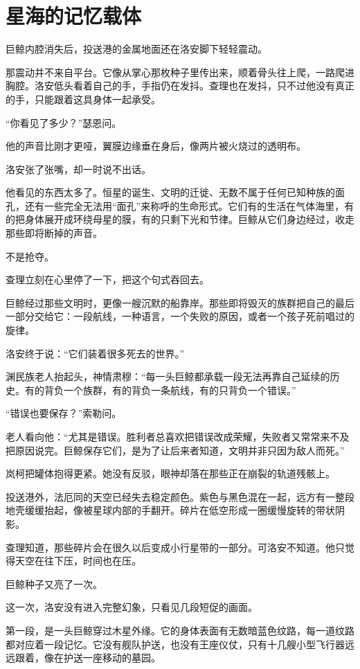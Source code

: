 \chapter{星海的记忆载体}

巨鲸内腔消失后，投送港的金属地面还在洛安脚下轻轻震动。

那震动并不来自平台。它像从掌心那枚种子里传出来，顺着骨头往上爬，一路爬进胸腔。洛安低头看着自己的手，手指仍在发抖。查理也在发抖，只不过他没有真正的手，只能跟着这具身体一起承受。

“你看见了多少？”瑟恩问。

他的声音比刚才更哑，翼膜边缘垂在身后，像两片被火烧过的透明布。

洛安张了张嘴，却一时说不出话。

他看见的东西太多了。恒星的诞生、文明的迁徙、无数不属于任何已知种族的面孔，还有一些完全无法用“面孔”来称呼的生命形式。它们有的生活在气体海里，有的把身体展开成环绕母星的膜，有的只剩下光和节律。巨鲸从它们身边经过，收走那些即将断掉的声音。

不是抢夺。

查理立刻在心里停了一下，把这个句式吞回去。

巨鲸经过那些文明时，更像一艘沉默的船靠岸。那些即将毁灭的族群把自己的最后一部分交给它：一段航线，一种语言，一个失败的原因，或者一个孩子死前唱过的旋律。

洛安终于说：“它们装着很多死去的世界。”

渊民族老人抬起头，神情肃穆：“每一头巨鲸都承载一段无法再靠自己延续的历史。有的背负一个族群，有的背负一条航线，有的只背负一个错误。”

“错误也要保存？”索勒问。

老人看向他：“尤其是错误。胜利者总喜欢把错误改成荣耀，失败者又常常来不及把原因说完。巨鲸保存它们，是为了让后来者知道，文明并非只因为敌人而死。”

岚柯把罐体抱得更紧。她没有反驳，眼神却落在那些正在崩裂的轨道残骸上。

投送港外，法厄同的天空已经失去稳定颜色。紫色与黑色混在一起，远方有一整段地壳缓缓抬起，像被星球内部的手翻开。碎片在低空形成一圈缓慢旋转的带状阴影。

查理知道，那些碎片会在很久以后变成小行星带的一部分。可洛安不知道。他只觉得天空在往下压，时间也在压。

巨鲸种子又亮了一次。

这一次，洛安没有进入完整幻象，只看见几段短促的画面。

第一段，是一头巨鲸穿过木星外缘。它的身体表面有无数暗蓝色纹路，每一道纹路都对应着一段记忆。它没有舰队护送，也没有王座仪仗，只有十几艘小型飞行器远远跟着，像在护送一座移动的墓园。

